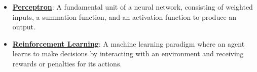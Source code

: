 \documentclass{article}%
\begin{document}
\begin{itemize}[leftmargin=*]
\item \href{https://purdue.brightspace.com/d2l/common/assets/pdfjs-d2l-dist/1.0.14-legacy/web/viewer.html?file=\%2Fcontent\%2Fenforced\%2F1095467-wl.202510.CS.24300.001\%2F02L2-Intro.pdf\%3Fou\%3D1095467\&lang=en-us\&container=d2l-fileviewer-rendered-pdf\&fullscreen=d2l-fileviewer-rendered-pdf-dialog\&height=667#page=45}{\textbf{Perceptron}}: A fundamental unit of a neural network, consisting of weighted inputs, a summation function, and an activation function to produce an output.%
\item \href{https://purdue.brightspace.com/d2l/common/assets/pdfjs-d2l-dist/1.0.14-legacy/web/viewer.html?file=\%2Fcontent\%2Fenforced\%2F1095467-wl.202510.CS.24300.001\%2F02L2-Intro.pdf\%3Fou\%3D1095467\&lang=en-us\&container=d2l-fileviewer-rendered-pdf\&fullscreen=d2l-fileviewer-rendered-pdf-dialog\&height=667#page=46}{\textbf{Reinforcement Learning}}: A machine learning paradigm where an agent learns to make decisions by interacting with an environment and receiving rewards or penalties for its actions.%
\end{itemize}%
\end{document}
